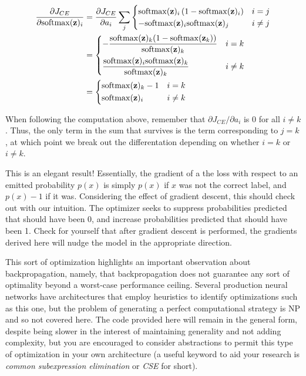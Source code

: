 \documentclass[
]{article}
\begin{document}
\[
\begin{aligned}
\frac{\partial J_{CE}}{\partial \mathrm{softmax}(\mathbf{z})_i} &= \frac{\partial J_{CE}}{\partial a_i}\sum_{j} \begin{cases}
\mathrm{softmax}(\mathbf{z})_i\left(1 - \mathrm{softmax}(\mathbf{z})_i\right) & i = j \\
-\mathrm{softmax}(\mathbf{z})_i \mathrm{softmax}(\mathbf{z})_j & i \neq j
\end{cases} \\
&= \begin{dcases}
-\frac{\mathrm{softmax}(\mathbf{z})_k(1 - \mathrm{softmax}(\mathbf{z}_k))}{\mathrm{softmax}(\mathbf{z})_k} & i = k \\
\frac{\mathrm{softmax}(\mathbf{z})_i\mathrm{softmax}(\mathbf{z})_k}{\mathrm{softmax}(\mathbf{z})_k} & i \neq k\\
\end{dcases} \\
&= \begin{dcases}
\mathrm{softmax}(\mathbf{z})_k - 1 & i = k \\
\mathrm{softmax}(\mathbf{z})_i & i \neq k
\end{dcases}
\end{aligned}
\]

When following the computation above, remember that
\(\partial J_{CE} / \partial a_i\) is 0 for all \(i \neq k\). Thus, the
only term in the sum that survives is the term corresponding to
\(j = k\), at which point we break out the differentation depending on
whether \(i = k\) or \(i \neq k\).

This is an elegant result! Essentially, the gradient of a the loss with
respect to an emitted probability \(p(x)\) is simply \(p(x)\) if \(x\)
was not the correct label, and \(p(x) - 1\) if it was. Considering the
effect of gradient descent, this should check out with our intuition.
The optimizer seeks to suppress probabilities predicted that should have
been 0, and increase probabilities predicted that should have been 1.
Check for yourself that after gradient descent is performed, the
gradients derived here will nudge the model in the appropriate
direction.

This sort of optimization highlights an important observation about
backpropagation, namely, that backpropagation does not guarantee any
sort of optimality beyond a worst-case performance ceiling. Several
production neural networks have architectures that employ heuristics to
identify optimizations such as this one, but the problem of generating a
perfect computational strategy is NP and so not covered here. The code
provided here will remain in the general form, despite being slower in
the interest of maintaining generality and not adding complexity, but
you are encouraged to consider abstractions to permit this type of
optimization in your own architecture (a useful keyword to aid your
research is \emph{common subexpression elimination} or \emph{CSE} for
short).
\end{document}
